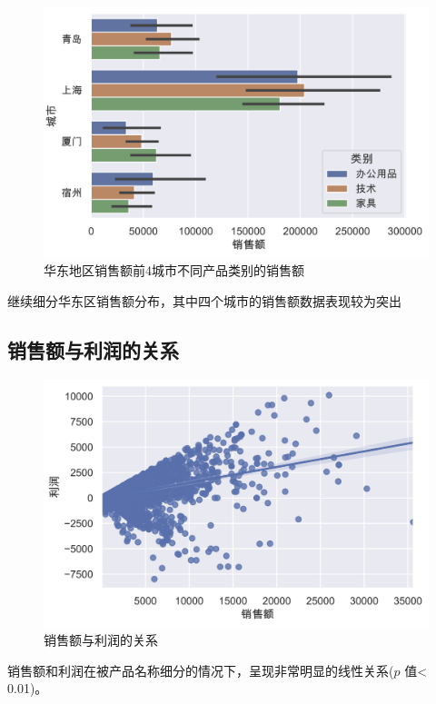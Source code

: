\documentclass[a4paper]{ctexart}
\begin{document}
\begin{figure}[H]
    \centering
    \includegraphics[width=\textwidth]{figures/city_total}
    \caption{华东地区销售额前4城市不同产品类别的销售额}
\end{figure}
继续细分华东区销售额分布，其中四个城市的销售额数据表现较为突出


\subsection{销售额与利润的关系}
\begin{figure}[H]
    \centering
    \includegraphics[width=\textwidth]{figures/rel}
    \caption{销售额与利润的关系}
\end{figure}
销售额和利润在被产品名称细分的情况下，呈现非常明显的线性关系($p$ 值< 0.01)。
\end{document}
